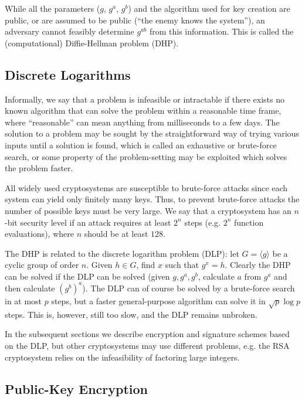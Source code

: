 \documentclass[a4paper,12pt]{article}
\begin{document}
While all the parameters ($g$, $g^a$, $g^b$) and the algorithm used for key creation are public, or are assumed to be public (``the enemy knows the system''), an adversary cannot feasibly determine $g^{ab}$ from this information. This is called the (computational) Diffie-Hellman problem (DHP).

\subsection{Discrete Logarithms}

Informally, we say that a problem is infeasible or intractable if there exists no known algorithm that can solve the problem within a reasonable time frame, where ``reasonable'' can mean anything from milliseconds to a few days. The solution to a problem may be sought by the straightforward way of trying various inputs until a solution is found, which is called an exhaustive or brute-force search, or some property of the problem-setting may be exploited which solves the problem faster.

All widely used cryptosystems are susceptible to brute-force attacks since each system can yield only finitely many keys. Thus, to prevent brute-force attacks the number of possible keys must be very large. We say that a cryptosystem has an $n$-bit security level if an attack requires at least $2^n$ steps (e.g. $2^n$ function evaluations), where $n$ should be at least $128$. \cite[p. 36]{schneier}

The DHP is related to the discrete logarithm problem (DLP): let $G = \langle g \rangle$ be a cyclic group of order $n$. Given $h \in G$, find $x$ such that $g^x = h$. Clearly the DHP can be solved if the DLP can be solved (given $g,g^a,g^b$, calculate $a$ from $g^a$ and then calculate $(g^b)^a$). The DLP can of course be solved by a brute-force search in at most $p$ steps, but a faster general-purpose algorithm can solve it in $\sqrt{p} \log{p}$ steps. This is, however, still too slow, and the DLP remains unbroken. \cite[p. 78]{hoffstein}

In the subsequent sections we describe encryption and signature schemes based on the DLP, but other cryptosystems may use different problems, e.g. the RSA cryptosystem relies on the infeasibility of factoring large integers.

\subsection{Public-Key Encryption}
\end{document}

